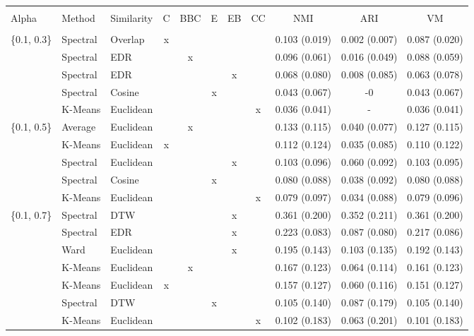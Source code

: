\documentclass[12pt,a4paper,bibliography=totocnumbered,listof=totocnumbered]{scrartcl}
\begin{document}
{\begin{appendix}
\begin{table}[H] \centering 
	\label{} 
	\scriptsize
	\begin{tabularx}{\textwidth}{ lllcccccccc} \\
		\\[-1.8ex]	\toprule
		\\[-1.8ex] 
		Alpha & Method & Similarity & C & BBC & E & EB & CC & NMI & ARI & VM \\ 
		\hline \\[-1.8ex] 
\{0.1, 0.3\} & Spectral  & Overlap & x &  &  &  &  & 0.103 (0.019) & 0.002 (0.007) & 0.087 (0.020) \\ 
& Spectral  & EDR &  & x &  &  &  & 0.096 (0.061) & 0.016 (0.049) & 0.088 (0.059) \\ 
& Spectral  & EDR &  &  &  & x &  & 0.068 (0.080) & 0.008 (0.085) & 0.063 (0.078) \\ 
& Spectral  & Cosine &  &  & x &  &  & 0.043 (0.067) & -0 & 0.043 (0.067) \\ 
& K-Means & Euclidean  &  &  &  &  & x & 0.036 (0.041) &  -  & 0.036 (0.041) \\ 
\{0.1, 0.5\} & Average & Euclidean  &  & x &  &  &  & 0.133 (0.115) & 0.040 (0.077) & 0.127 (0.115) \\ 
& K-Means & Euclidean  & x &  &  &  &  & 0.112 (0.124) & 0.035 (0.085) & 0.110 (0.122) \\ 
& Spectral  & Euclidean  &  &  &  & x &  & 0.103 (0.096) & 0.060 (0.092) & 0.103 (0.095) \\ 
& Spectral  & Cosine &  &  & x &  &  & 0.080 (0.088) & 0.038 (0.092) & 0.080 (0.088) \\ 
& K-Means & Euclidean  &  &  &  &  & x & 0.079 (0.097) & 0.034 (0.088) & 0.079 (0.096) \\ 
\{0.1, 0.7\} & Spectral  & DTW &  &  &  & x &  & 0.361 (0.200) & 0.352 (0.211) & 0.361 (0.200) \\ 
& Spectral  & EDR &  &  &  & x &  & 0.223 (0.083) & 0.087 (0.080) & 0.217 (0.086) \\ 
& Ward & Euclidean  &  &  &  & x &  & 0.195 (0.143) & 0.103 (0.135) & 0.192 (0.143) \\ 
& K-Means & Euclidean  &  & x &  &  &  & 0.167 (0.123) & 0.064 (0.114) & 0.161 (0.123) \\ 
& K-Means & Euclidean  & x &  &  &  &  & 0.157 (0.127) & 0.060 (0.116) & 0.151 (0.127) \\ 
& Spectral  & DTW &  &  & x &  &  & 0.105 (0.140) & 0.087 (0.179) & 0.105 (0.140) \\ 
& K-Means & Euclidean  &  &  &  &  & x & 0.102 (0.183) & 0.063 (0.201) & 0.101 (0.183) \\ 

\end{tabularx}
\end{table}
\end{appendix}}
\end{document}
